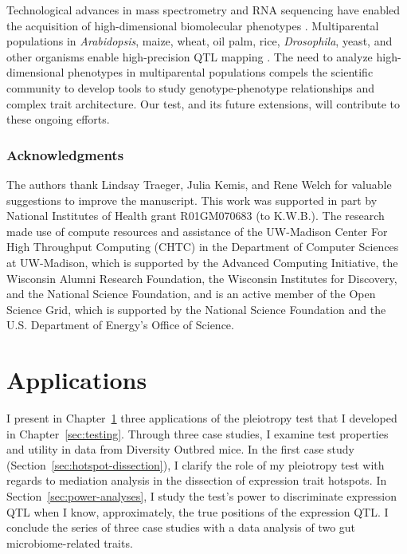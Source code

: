 \documentclass[oneside]{book}\usepackage[]{graphicx}\usepackage[]{color}
\begin{document}
Technological advances
in mass spectrometry and RNA sequencing have enabled the acquisition of
high-dimensional biomolecular phenotypes
\citep{ozsolak2011rna,han2012multi}. Multiparental populations in
\textit{Arabidopsis}, maize, wheat, oil palm, rice,
\textit{Drosophila}, yeast, and other organisms enable high-precision
QTL mapping \citep{yu2008genetic, tisne2017identification,
  stanley2017genetic, raghavan2017approaches, mackay2012drosophila,
  kover2009multiparent, cubillos2013high}. The need to analyze
high-dimensional phenotypes in multiparental populations compels the
scientific community to develop tools to study genotype-phenotype
relationships and complex trait architecture. Our test, and its future
extensions, will contribute to these ongoing efforts.




\subsection*{Acknowledgments}

The authors thank Lindsay Traeger, Julia Kemis, and Rene Welch for
valuable suggestions to improve the manuscript. This work was
supported in part by National Institutes of Health grant R01GM070683
(to K.W.B.). The research made use of compute resources and assistance
of the UW-Madison Center For High Throughput Computing (CHTC) in the
Department of Computer Sciences at UW-Madison, which is supported by
the Advanced Computing Initiative, the Wisconsin Alumni Research
Foundation, the Wisconsin Institutes for Discovery, and the National
Science Foundation, and is an active member of the Open Science Grid,
which is supported by the National Science Foundation and the U.S.
Department of Energy's Office of Science.

\chapter{Applications}\label{sec:applications}

I present in Chapter~\ref{sec:applications} three applications of the
pleiotropy test that I developed in Chapter~\ref{sec:testing}. Through three case studies, I examine test properties and utility in data from Diversity Outbred mice. In the first case study (Section~\ref{sec:hotspot-dissection}), I clarify the role of my pleiotropy test with regards to mediation analysis in the dissection of expression trait hotspots. In Section~\ref{sec:power-analyses}, I study the test's power to discriminate expression QTL when I know, approximately, the true positions of the expression QTL. I conclude the series of three case studies with a data analysis of two gut microbiome-related traits.
\end{document}
